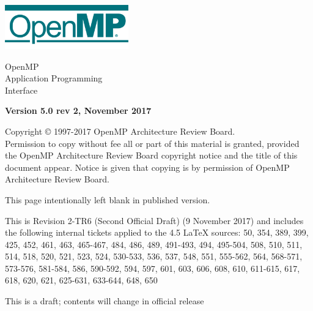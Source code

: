 
  \begin{titlepage}
    \begin{flushleft}
     \hspace{-6em} \includegraphics[width=0.4\textwidth]{openmp-logo.png}
    \end{flushleft}

    \begin{adjustwidth}{-0.75in}{0in}
    \begin{center}
      \Huge
      \textsf{OpenMP\\Application Programming\\Interface}

      \vspace{0.5in}\textsf{    }\vspace{-0.7in}
      \normalsize

      \vspace{1.0in}

      \textbf{Version 5.0 rev 2, November 2017}
    \end{center}
    \end{adjustwidth}

    \vspace{3.0in}

\begin{adjustwidth}{0pt}{1em}\setlength{\parskip}{0.25\baselineskip}%
Copyright © 1997-2017 OpenMP Architecture Review Board.\\
Permission to copy without fee all or part of this material is granted,
provided the OpenMP Architecture Review Board copyright notice and
the title of this document appear. Notice is given that copying is by
permission of OpenMP Architecture Review Board.\end{adjustwidth}

  \end{titlepage}


\clearpage
\thispagestyle{empty}
\phantom{a}
This page intentionally left blank in published version.

This is Revision 2-TR6 (Second Official Draft) (9 November 2017) and 
includes the following internal tickets applied to the 4.5 LaTeX sources: 
50, 354, 389, 399, 425, 452, 461, 463, 465-467, 484, 486, 489, 491-493, 494, 
495-504, 508, 510, 511, 514, 518, 520, 521, 523, 524, 530-533, 536, 537, 
548, 551, 555-562, 564, 568-571, 573-576, 581-584, 586, 590-592, 594, 
597, 601, 603, 606, 608, 610, 611-615, 617, 618, 620, 621, 625-631, 633-644, 
648, 650

This is a draft; contents will change in official release

\vfill

